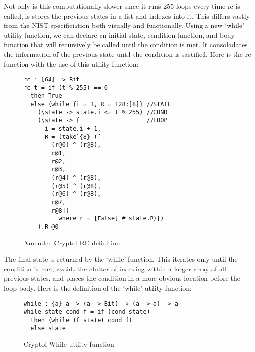 Not only is this computationally slower since it runs 255 loops every time rc is called, 
is stores the previous states in a list and indexes into it. This differs vastly from the 
NIST specificiation both visually and functionally. Using a new ‘while’ utility function, we 
can declare an initial state, condition function, and body function that will recursively 
be called until the condition is met. It consolodates the information of the previous state 
until the condition is sastified. Here is the rc function with the use of this utility 
function:

\begin{figure}[h]
  \centering
\begin{verbatim}
rc : [64] -> Bit
rc t = if (t % 255) == 0 
  then True 
  else (while {i = 1, R = 128:[8]} //STATE
    (\state -> state.i <= t % 255) //COND
    (\state -> {                   //LOOP
      i = state.i + 1, 
      R = (take`{8} ([
        (r@0) ^ (r@8),
        r@1,
        r@2,
        r@3,
        (r@4) ^ (r@8),
        (r@5) ^ (r@8),
        (r@6) ^ (r@8),
        r@7, 
        r@8]) 
          where r = [False] # state.R)})
    ).R @0
\end{verbatim}
\caption{Amended Cryptol RC definition}
\label{fig:cryptolamendedRC}
\end{figure}

The final state is returned by the ‘while’ function. This iterates only until the 
condition is met, avoids the clutter of indexing within a larger array of all previous 
states, and places the condition in a more obvious location before the loop body. Here 
is the definition of the ‘while’ utility function:

\begin{figure}[h]
  \centering
\begin{verbatim}
while : {a} a -> (a -> Bit) -> (a -> a) -> a
while state cond f = if (cond state)
  then (while (f state) cond f)	
  else state
\end{verbatim}
\caption{Cryptol While utility function}
\label{fig:cryptolWhile}
\end{figure}